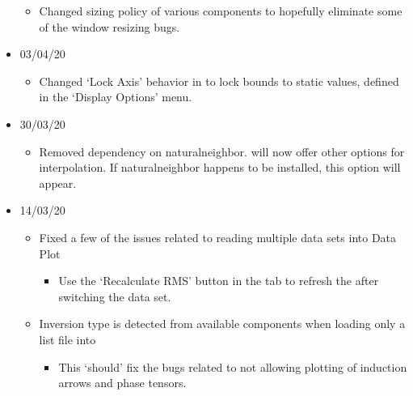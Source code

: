 \documentclass[letterpaper,10pt,english]{sphinxmanual}
\begin{document}
\begin{itemize}
\begin{itemize}
\item {} 
Changed sizing policy of various {\hyperref[\detokenize{content/model_viewer/main_window:model-viewer}]{}} components to hopefully eliminate some of the window resizing bugs.

\end{itemize}

\item {} 
03/04/20
\begin{itemize}
\item {} 
Changed ‘Lock Axis’ behavior in {\hyperref[\detokenize{content/data_plot/main_window:data-plot}]{}} to lock bounds to static values, defined in the ‘Display Options’ menu.

\end{itemize}

\item {} 
30/03/20
\begin{itemize}
\item {} 
Removed dependency on naturalneighbor. {\hyperref[\detokenize{content/data_plot/main_window:data-plot}]{}} will now offer other options for interpolation. If naturalneighbor happens to be installed, this option will appear.

\end{itemize}

\item {} 
14/03/20
\begin{itemize}
\item {} 
Fixed a few of the issues related to reading multiple data sets into Data Plot
\begin{itemize}
\item {} 
Use the ‘Recalculate RMS’ button in the  tab to refresh the {\hyperref[\detokenize{content/data_plot/main_window:misfit-table}]{}} after switching the data set.

\end{itemize}

\item {} 
Inversion type is detected from available components when loading only a list file into {\hyperref[\detokenize{content/data_plot/main_window:data-plot}]{}}
\begin{itemize}
\item {} 
This ‘should’ fix the bugs related to {\hyperref[\detokenize{content/data_plot/map_viewer:map-viewer}]{}} not allowing plotting of induction arrows and phase tensors.


\end{itemize}
\end{itemize}
\end{itemize}
\end{document}
